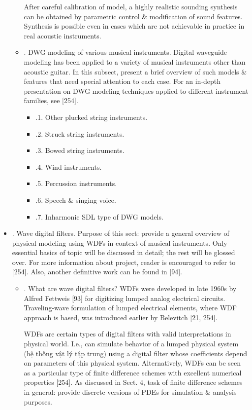 \documentclass{article}
\begin{document}
\begin{itemize}
\begin{itemize}
		After careful calibration of model, a highly realistic sounding synthesis can be obtained by parametric control \& modification of sound features. Synthesis is possible even in cases which are not achievable in practice in real acoustic instruments.		
		\item {. DWG modeling of various musical instruments.} Digital waveguide modeling has been applied to a variety of musical instruments other than acoustic guitar. In this subsect, present a brief overview of such models \& features that need special attention to each case. For an in-depth presentation on DWG modeling techniques applied to different instrument families, see [254].
		\begin{itemize}
			\item {.1. Other plucked string instruments.}
			\item {.2. Struck string instruments.}
			\item {.3. Bowed string instruments.}
			\item {.4. Wind instruments.}
			\item {.5. Percussion instruments.}
			\item {.6. Speech \& singing voice.}
			\item {.7. Inharmonic SDL type of DWG models.}
		\end{itemize}
	\end{itemize}
	\item {. Wave digital filters.} Purpose of this sect: provide a general overview of physical modeling using WDFs in context of musical instruments. Only essential basics of topic will be discussed in detail; the rest will be glossed over. For more information about project, reader is encouraged to refer to [254]. Also, another definitive work can be found in [94].
	\begin{itemize}
		\item {. What are wave digital filters?} WDFs were developed in late 1960s by {\sc Alfred Fettweis} [93] for digitizing lumped analog electrical circuits. Traveling-wave formulation of lumped electrical elements, where WDF approach is based, was introduced earlier by {\sc Belevitch} [21, 254].
		
		WDFs are certain types of digital filters with valid interpretations in physical world. I.e., can simulate behavior of a lumped physical system (hệ thống vật lý tập trung) using a digital filter whose coefficients depend on parameters of this physical system. Alternatively, WDFs can be seen as a particular type of finite difference schemes with excellent numerical properties [254]. As discussed in Sect. 4, task of finite difference schemes in general: provide discrete versions of PDEs for simulation \& analysis purposes.
		

\end{itemize}
\end{itemize}
\end{document}
